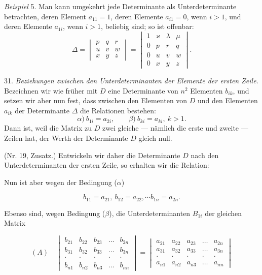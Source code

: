 \textit{Beispiel} 5. Man kann umgekehrt jede Determinante als
Unterdeterminante betrachten, deren Element $a_{11}=1$, deren Elemente
$a_{i1}=0$, wenn $i>1$, und deren Elemente $a_{1i}$, wenn $i>1$, beliebig
sind; so ist offenbar:
\[
\Delta=\begin{vmatrix} p & q & r \\ u & v & w \\ x & y & z \end{vmatrix}
=\begin{vmatrix}
1 & \varkappa & \lambda & \mu \\ %
0 & p & r & q \\ %
0 & u & v & w \\
0 & x & y & z
\end{vmatrix}.
\]

31. \textit{Beziehungen zwischen den Unterdeterminanten der Elemente der
ersten Zeile.} Bezeichnen wir wie früher mit $D$ eine Determinante von
$n^2$ Elementen $b_{ik}$, und setzen wir aber nun fest, dass zwischen den
Elementen von $D$ und den Elementen $a_{ik}$ der Determinante $\Delta$ die
Relationen bestehen:
\[
\alpha)\ b_{1i}=a_{2i}, \qquad \beta)\ b_{ki}=a_{ki},\ k>1.
\]
Dann ist, weil die Matrix zu $D$ zwei gleiche — nämlich die erste und
zweite — Zeilen hat, der Werth der Determinante $D$ gleich null.


(Nr. 19, Zusatz.) Entwickeln wir daher die Determinante $D$ nach den
Unterdeterminanten der ersten Zeile, so erhalten wir die Relation:


Nun ist aber wegen der Bedingung ($\alpha$)

\[
b_{11}=a_{21},\ b_{12}=a_{22},\cdots b_{1n}=a_{2n}.
\]

Ebenso sind, wegen Bedingung ($\beta$), die Unterdeterminanten $B_{1i}$ der
gleichen Matrix

\[
(A)\quad
\begin{vmatrix}
b_{21} & b_{22} & b_{23} & \ldots & b_{2n} \\
b_{31} & b_{32} & b_{33} & \ldots & b_{3n} \\
\cdot & \cdot & \cdot & \cdot & \cdot \\
b_{n1} & b_{n2} & b_{n3} & \ldots & b_{nn}
\end{vmatrix}
=
\begin{vmatrix}
a_{21} & a_{22} & a_{23} & \ldots & a_{2n} \\
a_{31} & a_{32} & a_{33} & \ldots & a_{3n} \\
\cdot & \cdot & \cdot & \cdot & \cdot \\
a_{n1} & a_{n2} & a_{n3} & \ldots & a_{nn}
\end{vmatrix}
\]

